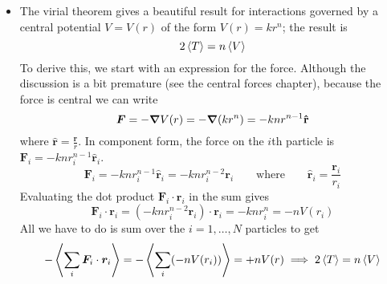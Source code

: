 \documentclass[11pt, a4paper]{article}
\newcommand{\eqtext}[1]{\qquad \text{#1} \qquad}
\newcommand{\uvec}[1]{\bm{\hat{\mathbf{#1}}}} %
\begin{document}
\begin{itemize}
	\item The virial theorem gives a beautiful result for interactions governed by a central potential $ V = V(r) $ of the form $ V(r) = k r^{n}$; the result is
	\begin{equation*}
		2 \expval{T} = n \expval{V}
	\end{equation*} 
	To derive this, we start with an expression for the force. Although the discussion is a bit premature (see the central forces chapter), because the force is central we can write
	\begin{equation*}
		\bm{F} = -\grad{V}(r) = -\grad(kr^{n}) = - k n r^{n-1} \uvec{r}
	\end{equation*}
	where $ \uvec{r} = \frac{\bm{r}}{r} $. In component form, the force on the $ i $th particle is $ \bm{F}_{i} = - k n r_{i}^{n-1} \uvec{r}_{i} $.
	\begin{equation*}
		\bm{F}_{i} = - k n r_{i}^{n-1} \uvec{r}_{i} = -k n r_{i}^{n-2}\bm{r}_{i} \eqtext{where}  \uvec{r}_{i} = \frac{\bm{r}_{i}}{r_{i}}
	\end{equation*}
	Evaluating the dot product $ \bm{F}_{i} \cdot \bm{r}_{i} $ in the sum gives
	\begin{equation*}
		\bm{F}_{i} \cdot \bm{r}_{i} = \left(-k n r_{i}^{n-2}\bm{r}_{i}\right) \cdot \bm{r}_{i} = - k n r_{i}^{n} = -n V(r_{i})
	\end{equation*}
	All we have to do is sum over the $ i = 1, \ldots, N $ particles to get
	\begin{equation*}
		-\expval{\sum_{i} \bm{F}_{i} \cdot \bm{r}_{i}} = - \expval{\sum_{i} (-n V(r_{i}))} = + n V(r) \implies 2 \expval{T} = n \expval{V}
	\end{equation*}
		
\end{itemize}
\end{document}

